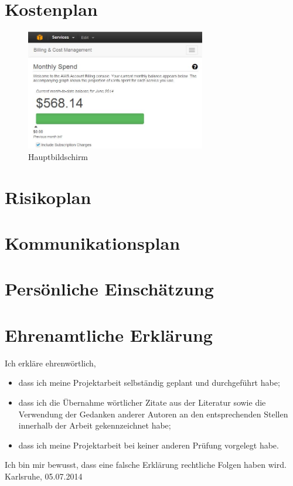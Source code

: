 \documentclass{article}
\begin{document}
\section{Kostenplan}

\begin{figure}[H]
    \centering
    \includegraphics[width=0.7\textwidth]{images/amazon-bill.jpg}
    \caption{Hauptbildschirm}
    \label{fig:overview}
\end{figure}

\section{Risikoplan}

\section{Kommunikationsplan}

\section{Persönliche Einschätzung}

\section{Ehrenamtliche Erklärung}

Ich erkläre ehrenwörtlich,
\begin{itemize}
    \item dass ich meine Projektarbeit selbständig geplant und durchgeführt habe;
    \item dass ich die Übernahme wörtlicher Zitate aus der Literatur sowie die Verwendung der Gedanken anderer Autoren an den entsprechenden Stellen innerhalb der Arbeit gekennzeichnet habe;
    \item dass ich meine Projektarbeit bei keiner anderen Prüfung
    vorgelegt habe.
\end{itemize}
Ich bin mir bewusst, dass eine falsche Erklärung rechtliche Folgen haben wird. \\

\vspace{1cm}
Karlsruhe, 05.07.2014 
\end{document}
